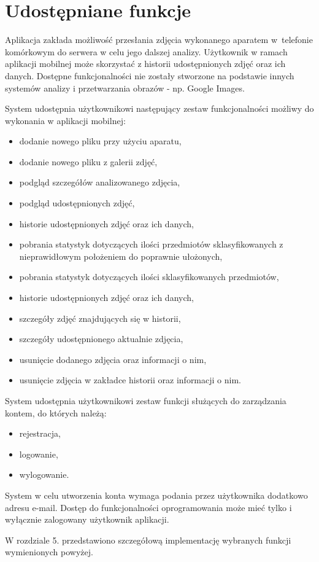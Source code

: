 \section{Udostępniane funkcje}
Aplikacja zakłada możliwość przesłania zdjęcia wykonanego aparatem w~telefonie komórkowym do serwera w celu jego dalszej analizy. Użytkownik w ramach aplikacji mobilnej może skorzystać z historii udostępnionych zdjęć oraz ich danych. Dostępne funkcjonalności nie zostały stworzone na podstawie innych systemów analizy i przetwarzania obrazów - np. Google Images.  

System udostępnia użytkownikowi następujący zestaw funkcjonalności możliwy do wykonania w aplikacji mobilnej:
\begin{itemize}[align=left]

	\item dodanie nowego pliku przy użyciu aparatu,
	\item dodanie nowego pliku z galerii zdjęć,
	\item podgląd szczegółów analizowanego zdjęcia,
	\item podgląd udostępnionych zdjęć,
	\item historie udostępnionych zdjęć oraz ich danych,
	\item pobrania statystyk dotyczących ilości przedmiotów sklasyfikowanych z nieprawidłowym położeniem do poprawnie ułożonych,
	\item pobrania statystyk dotyczących ilości sklasyfikowanych przedmiotów,
	\item historie udostępnionych zdjęć oraz ich danych,
	\item szczegóły zdjęć znajdujących się w historii,
	\item szczegóły udostępnionego aktualnie zdjęcia,
	\item usunięcie dodanego zdjęcia oraz informacji o nim,
	\item usunięcie zdjęcia w zakładce historii oraz informacji o nim.
	
\end{itemize}

System udostępnia użytkownikowi zestaw funkcji służących do zarządzania kontem, do których należą:
\begin{itemize}[align=left]
	\item rejestracja,
	\item logowanie,	
	\item wylogowanie.
\end{itemize}

System w celu utworzenia konta wymaga podania przez użytkownika dodatkowo adresu e-mail. Dostęp do funkcjonalności oprogramowania może mieć tylko i wyłącznie zalogowany użytkownik aplikacji. 

W rozdziale 5. przedstawiono szczegółową implementację wybranych funkcji wymienionych powyżej.